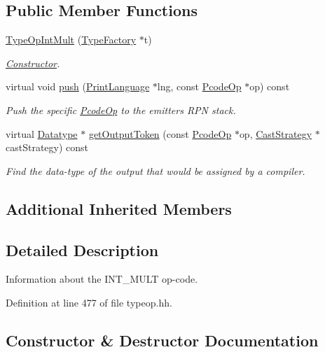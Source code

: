 \subsection*{Public Member Functions}
\begin{DoxyCompactItemize}
\item 
\mbox{\hyperlink{class_type_op_int_mult_af60bccdb3e89c94b5f435e0509d4bb51}{Type\+Op\+Int\+Mult}} (\mbox{\hyperlink{class_type_factory}{Type\+Factory}} $\ast$t)
\begin{DoxyCompactList}\small\item\em \mbox{\hyperlink{class_constructor}{Constructor}}. \end{DoxyCompactList}\item 
virtual void \mbox{\hyperlink{class_type_op_int_mult_ab24769881d82e5db9d0ad5f91975cd4c}{push}} (\mbox{\hyperlink{class_print_language}{Print\+Language}} $\ast$lng, const \mbox{\hyperlink{class_pcode_op}{Pcode\+Op}} $\ast$op) const
\begin{DoxyCompactList}\small\item\em Push the specific \mbox{\hyperlink{class_pcode_op}{Pcode\+Op}} to the emitter\textquotesingle{}s R\+PN stack. \end{DoxyCompactList}\item 
virtual \mbox{\hyperlink{class_datatype}{Datatype}} $\ast$ \mbox{\hyperlink{class_type_op_int_mult_abb986ab298da31068ac30163e6755e18}{get\+Output\+Token}} (const \mbox{\hyperlink{class_pcode_op}{Pcode\+Op}} $\ast$op, \mbox{\hyperlink{class_cast_strategy}{Cast\+Strategy}} $\ast$cast\+Strategy) const
\begin{DoxyCompactList}\small\item\em Find the data-\/type of the output that would be assigned by a compiler. \end{DoxyCompactList}\end{DoxyCompactItemize}
\subsection*{Additional Inherited Members}


\subsection{Detailed Description}
Information about the I\+N\+T\+\_\+\+M\+U\+LT op-\/code. 

Definition at line 477 of file typeop.\+hh.



\subsection{Constructor \& Destructor Documentation}
\mbox{\label{class_type_op_int_mult_af60bccdb3e89c94b5f435e0509d4bb51}} 

